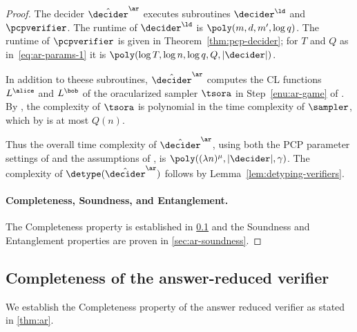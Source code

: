 \begin{proof}
The decider $\tdans$ executes subroutines $\decider^\ld$ and $\pcpverifier$.
The runtime of $\decider^\ld$ is $\poly(m, d, m', \log q)$.
The runtime of $\pcpverifier$ is given in Theorem~\ref{thm:pcp-decider}; for $T$
and $Q$ as in~\eqref{eq:ar-params-1} it is $\poly(\log T,\log n,\log q, Q,
|\decider|)$.
  
In addition to theese subroutines, $\tdans$ computes the CL functions $L^\alice$
and $L^\bob$ of the oracularized sampler $\tsora$ in Step~\ref{enu:ar-game} of
.
By , the complexity of $\tsora$ is polynomial in
the time complexity of $\sampler$, which by  is at
most $Q(n)$.
  
Thus the overall time complexity of $\tdans$, using both the PCP parameter
settings of  and the assumptions of
, is $\poly( (\lambda n)^\mu, |\decider|, \gamma)$.
The complexity of $\detype(\tdans)$ follows by
Lemma~\ref{lem:detyping-verifiers}.







\paragraph{Completeness, Soundness, and Entanglement.}
The Completeness property is established in \cref{sec:ar-completeness} and the
Soundness and Entanglement properties are proven in \cref{sec:ar-soundness}.
\end{proof}

\subsection{Completeness of the answer-reduced verifier}
\label{sec:ar-completeness}

We establish the Completeness property of the answer reduced verifier as stated
in \cref{thm:ar}.




